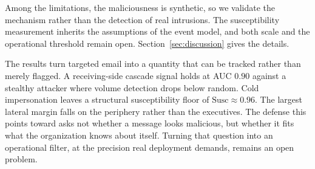 Among the limitations, the maliciousness is synthetic, so we validate the mechanism rather than the
detection of real intrusions. The susceptibility measurement inherits the assumptions of the event model, and
both scale and the operational threshold remain open. Section~\ref{sec:discussion} gives the details.

The results turn targeted email into a quantity that can be tracked rather than merely flagged. A receiving-side cascade signal holds at AUC $0.90$ against a stealthy attacker where volume detection drops below random. Cold impersonation leaves a structural susceptibility floor of $\mathrm{Susc}\!\approx\!0.96$. The largest lateral margin falls on the periphery rather than the executives. The defense this points toward asks not whether a message looks malicious, but whether it fits what the organization knows about itself. Turning that question into an operational filter, at the precision real deployment demands, remains an open problem.
